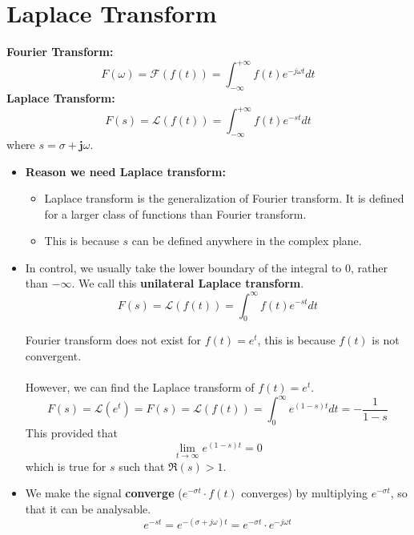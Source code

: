 \section{Laplace Transform}
\textbf{Fourier Transform:}
\[ F(\omega) = \mathcal{F} (f(t)) = \int_{-\infty}^{+\infty} f(t) e^{-j\omega t} dt \]
\textbf{Laplace Transform:}
\[ F(s) = \mathcal{L} (f(t)) = \int_{-\infty}^{+\infty} f(t) e^{-st} dt \]
\quad where $s = \sigma + \mathbf{j} \omega$.
\ \\
\begin{itemize}
    \item \textbf{Reason we need Laplace transform:}
    \begin{itemize}
        \item  Laplace transform is the generalization of Fourier transform. It is defined for a larger class of functions than Fourier transform.
        \item This is because $s$ can be defined anywhere in the complex plane.
    \end{itemize}
    
    \item In control, we usually take the lower boundary of the integral to 0, rather than $-\infty$. We call this \textbf{unilateral Laplace transform}. \[ F(s) = \mathcal{L} (f(t)) = \int_{0}^{\infty} f(t) e^{-st} dt \]
    \begin{ex}{}
     Fourier transform does not exist for $f(t)=e^{t}$, this is because $f(t)$ is not convergent.\\\\
     However, we can find the Laplace transform of  $f(t)=e^{t}$. \[ F(s) = \mathcal{L} (e^{t}) = F(s) = \mathcal{L} (f(t)) = \int_{0}^{\infty} e^{(1-s)t}  dt  = -\frac{1}{1-s} \] This provided that \[ \lim_{t \to \infty} e^{(1-s)t} = 0 \] which is true for $s$ such that $\Re(s)>1$.
    \end{ex}
    \item We make the signal \textbf{converge} ($e^{-\sigma t} \cdot f(t)$ converges) by multiplying $e^{-\sigma t}$, so that it can be analysable.
    \[
    e^{-st} = e^{-(\sigma + j\omega)t} = e^{-\sigma t}\cdot e^{-j\omega t} 
    \]
\end{itemize}

